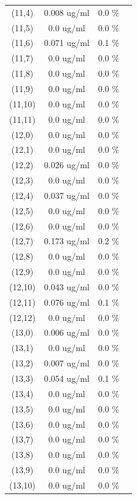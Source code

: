 \documentclass{article}
\begin{document}
\begin{tabular}{c c c c}
(11,4)&        0.008 ug/ml        &0.0 \%\\
(11,5)&        0.0 ug/ml        &0.0 \%\\
(11,6)&        0.071 ug/ml        &0.1 \%\\
(11,7)&        0.0 ug/ml        &0.0 \%\\
(11,8)&        0.0 ug/ml        &0.0 \%\\
(11,9)&        0.0 ug/ml        &0.0 \%\\
(11,10)&        0.0 ug/ml        &0.0 \%\\
(11,11)&        0.0 ug/ml        &0.0 \%\\
(12,0)&        0.0 ug/ml        &0.0 \%\\
(12,1)&        0.0 ug/ml        &0.0 \%\\
(12,2)&        0.026 ug/ml        &0.0 \%\\
(12,3)&        0.0 ug/ml        &0.0 \%\\
(12,4)&        0.037 ug/ml        &0.0 \%\\
(12,5)&        0.0 ug/ml        &0.0 \%\\
(12,6)&        0.0 ug/ml        &0.0 \%\\
(12,7)&        0.173 ug/ml        &0.2 \%\\
(12,8)&        0.0 ug/ml        &0.0 \%\\
(12,9)&        0.0 ug/ml        &0.0 \%\\
(12,10)&        0.043 ug/ml        &0.0 \%\\
(12,11)&        0.076 ug/ml        &0.1 \%\\
(12,12)&        0.0 ug/ml        &0.0 \%\\
(13,0)&        0.006 ug/ml        &0.0 \%\\
(13,1)&        0.0 ug/ml        &0.0 \%\\
(13,2)&        0.007 ug/ml        &0.0 \%\\
(13,3)&        0.054 ug/ml        &0.1 \%\\
(13,4)&        0.0 ug/ml        &0.0 \%\\
(13,5)&        0.0 ug/ml        &0.0 \%\\
(13,6)&        0.0 ug/ml        &0.0 \%\\
(13,7)&        0.0 ug/ml        &0.0 \%\\
(13,8)&        0.0 ug/ml        &0.0 \%\\
(13,9)&        0.0 ug/ml        &0.0 \%\\
(13,10)&        0.0 ug/ml        &0.0 \%\\

\end{tabular}
\end{document}
